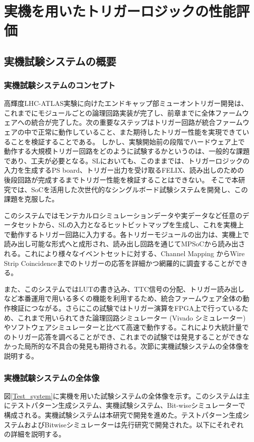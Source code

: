 　\chapter{実機を用いたトリガーロジックの性能評価}
\label{chap_TriggerTest}

\section{実機試験システムの概要}
\subsection{実機試験システムのコンセプト}
高輝度LHC-ATLAS実験に向けたエンドキャップ部ミューオントリガー開発は、これまでにモジュールごとの論理回路実装が完了し、前章までに全体ファームウェアへの統合が完了した。次の重要なステップはトリガー回路が統合ファームウェアの中で正常に動作していること、また期待したトリガー性能を実現できていることを検証することである。
しかし、実験開始前の段階でハードウェア上で動作する大規模トリガー回路をどのように試験するかというのは、一般的な課題であり、工夫が必要となる。SLにおいても、このままでは、トリガーロジックの入力を生成するPS board、トリガー出力を受け取るFELIX、読み出しのための後段回路が完成するまでトリガー性能を検証することはできない。
そこで本研究では、SoCを活用した次世代的なシングルボード試験システムを開発し、この課題を克服した。

このシステムではモンテカルロシミュレーションデータや実データなど任意のデータセットから、SLの入力となるヒットビットマップを生成し、これを実機上で動作するトリガー回路に入力する。各トリガーモジュールの出力は、実機上で読み出し可能な形式へと成形され、読み出し回路を通じてMPSoCから読み出される。これにより様々なイベントセットに対する、Channel Mapping からWire Strip Coincidenceまでのトリガーの応答を詳細かつ網羅的に調査することができる。

また、このシステムではLUTの書き込み、TTC信号の分配、トリガー読み出しなど本番運用で用いる多くの機能を利用するため、統合ファームウェア全体の動作検証につながる。さらにこの試験ではトリガー演算をFPGA上で行っているため、これまで用いられてきた論理回路シミュレーター (Vivado シミュレーター) やソフトウェアシミュレーターと比べて高速で動作する。これにより大統計量でのトリガー応答を調べることができ、これまでの試験では発見することができなかった局所的な不具合の発見も期待される。次節に実機試験システムの全体像を説明する。

\subsection{実機試験システムの全体像}
\label{subsec_TestSystemOverview}
図\ref{Test_system}に実機を用いた試験システムの全体像を示す。このシステムは主にテストパターン生成システム、実機試験システム、Bit-wiseシミュレーターで構成される。実機試験システムは本研究で開発を進めた。テストパターン生成システムおよびBitwiseシミュレーターは先行研究で開発された\cite{mt_yamashitaz}。以下にそれぞれの詳細を説明する。


